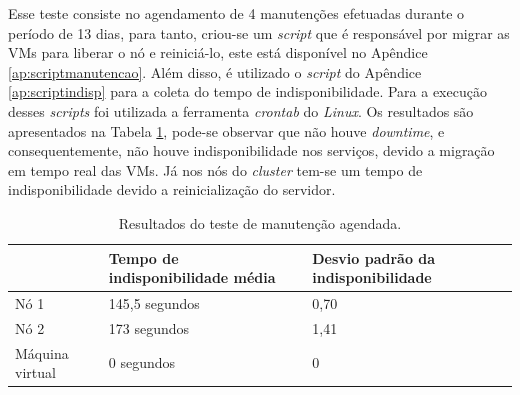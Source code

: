 
Esse teste consiste no agendamento de 4 manutenções efetuadas durante o período de 13 dias, para tanto, criou-se um \textit{script} que é 
responsável por migrar as \acp{VM} para liberar o nó e reiniciá-lo, este está disponível no Apêndice \ref{ap:scriptmanutencao}. 
Além disso, é utilizado o \textit{script} do Apêndice \ref{ap:scriptindisp} para a coleta do tempo de indisponibilidade. 
Para a execução desses \textit{scripts} foi utilizada a ferramenta \textit{crontab} do \textit{Linux}. 
Os resultados são apresentados na Tabela \ref{tab:teste3resultados}, pode-se observar que não houve \textit{downtime}, e consequentemente, não 
houve indisponibilidade nos serviços, devido a migração em tempo real das \acp{VM}. Já nos nós do \textit{cluster} tem-se um tempo de 
indisponibilidade devido a reinicialização do servidor.


\begin{table}[h!]
\caption{Resultados do teste de manutenção agendada.}
\label{tab:teste3resultados}
\begin{center}
\begin{tabular}{|l|l|l|}\hline
 & \textbf{Tempo de indisponibilidade média} & \textbf{Desvio padrão da indisponibilidade} \\\hline
Nó 1 & 145,5 segundos & 0,70 \\\hline
Nó 2 & 173 segundos & 1,41 \\\hline
Máquina virtual & 0 segundos & 0 \\\hline
\end{tabular}
\end{center}
\end{table}

